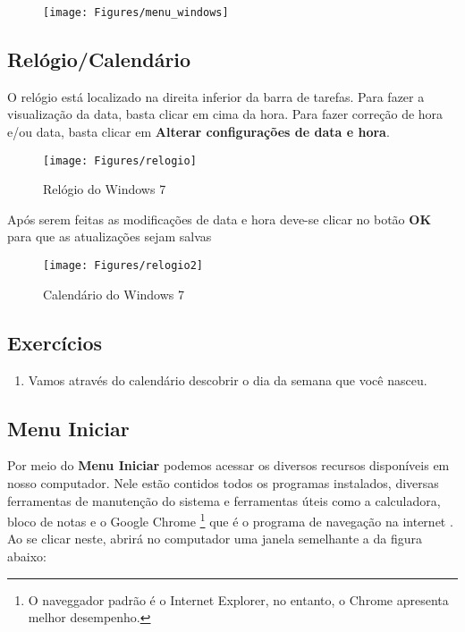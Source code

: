 \documentclass[hidelinks,12pt]{article}
\begin{document}
		\begin{figure}[!h]
			\centering
			\texttt{[image: Figures/menu\_windows]}
			\label{fig:menu_windows}

		\end{figure}
  \newpage
  \subsection{Relógio/Calendário}

	O relógio está localizado na direita inferior da barra de tarefas. Para fazer a visualização da data, basta clicar em cima da hora. Para fazer correção de hora e/ou data, basta clicar em {\bf Alterar configurações de data e hora}.

	\begin{figure}[!hb]
		\centering
		\texttt{[image: Figures/relogio]}
		\caption{Relógio do Windows 7}
		\label{fig:relogio}

	\end{figure}

	Após serem feitas as modificações de data e hora deve-se clicar no botão {\bf OK} para que as atualizações sejam salvas

	\begin{figure}[!h]
		\centering
		\texttt{[image: Figures/relogio2]}
		\caption{Calendário do Windows 7}
		\label{fig:calendario}

	\end{figure}

	\newpage

	\subsection{Exercícios}
	\begin{enumerate}
		\item Vamos através do calendário descobrir o dia da semana que você nasceu.
	\end{enumerate}



	\newpage
	\subsection{Menu Iniciar}

	Por meio do \textbf{Menu Iniciar} podemos acessar os diversos recursos disponíveis em nosso computador. Nele estão contidos todos os programas instalados, diversas ferramentas de manutenção do sistema e ferramentas úteis como a calculadora, bloco de notas e o Google Chrome \footnote{O naveggador padrão é o Internet Explorer, no entanto, o Chrome apresenta melhor desempenho.} que é o programa de navegação na internet . Ao se clicar neste, abrirá no computador uma janela semelhante a da figura abaixo:
\end{document}
